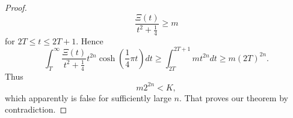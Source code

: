 \begin{proof}
\begin{equation*}
	\frac{\Xi(t)}{t^2 + \frac{1}{4}} \geq m
\end{equation*}
	for $2T \leq t \leq 2T + 1$. Hence
\begin{equation*}
	\int _T ^{\infty} \frac{\Xi(t)}{t^2 + \frac{1}{4}} t^{2n} \cosh(\frac{1}{4} \pi t) dt \geq \int _{2T} ^{2T + 1} mt^{2n} dt \geq m(2T)^{2n}.
\end{equation*}
	Thus
\begin{equation*}
	m2^{2n} < K,
\end{equation*}
	which apparently is false for sufficiently large $n$. That proves our theorem by contradiction.
\end{proof}